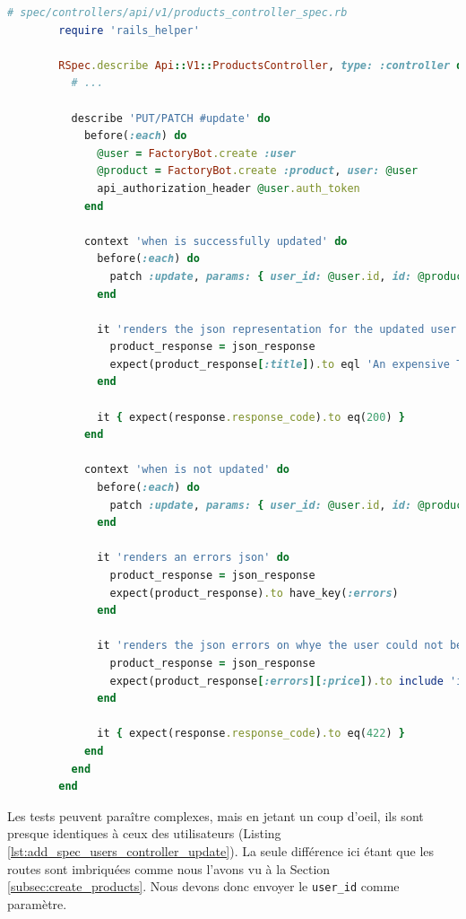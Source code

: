 \documentclass[]{report}
\begin{document}
      \begin{scriptsize}
        \begin{lstlisting}[language=ruby, caption={Test de mise à jour des produits}, label={lst:update_index_products_controller_spec}]
        # spec/controllers/api/v1/products_controller_spec.rb
        require 'rails_helper'

        RSpec.describe Api::V1::ProductsController, type: :controller do
          # ...

          describe 'PUT/PATCH #update' do
            before(:each) do
              @user = FactoryBot.create :user
              @product = FactoryBot.create :product, user: @user
              api_authorization_header @user.auth_token
            end

            context 'when is successfully updated' do
              before(:each) do
                patch :update, params: { user_id: @user.id, id: @product.id, product: { title: 'An expensive TV' } }
              end

              it 'renders the json representation for the updated user' do
                product_response = json_response
                expect(product_response[:title]).to eql 'An expensive TV'
              end

              it { expect(response.response_code).to eq(200) }
            end

            context 'when is not updated' do
              before(:each) do
                patch :update, params: { user_id: @user.id, id: @product.id, product: { price: 'two hundred' } }
              end

              it 'renders an errors json' do
                product_response = json_response
                expect(product_response).to have_key(:errors)
              end

              it 'renders the json errors on whye the user could not be created' do
                product_response = json_response
                expect(product_response[:errors][:price]).to include 'is not a number'
              end

              it { expect(response.response_code).to eq(422) }
            end
          end
        end
        \end{lstlisting}
      \end{scriptsize}

      Les tests peuvent paraître complexes, mais en jetant un coup d'oeil, ils sont presque identiques à ceux des utilisateurs (Listing \ref{lst:add_spec_users_controller_update}). La seule différence ici étant que les routes sont imbriquées comme nous l'avons vu à la Section \ref{subsec:create_products}. Nous devons donc envoyer le \verb|user_id| comme paramètre.
\end{document}

